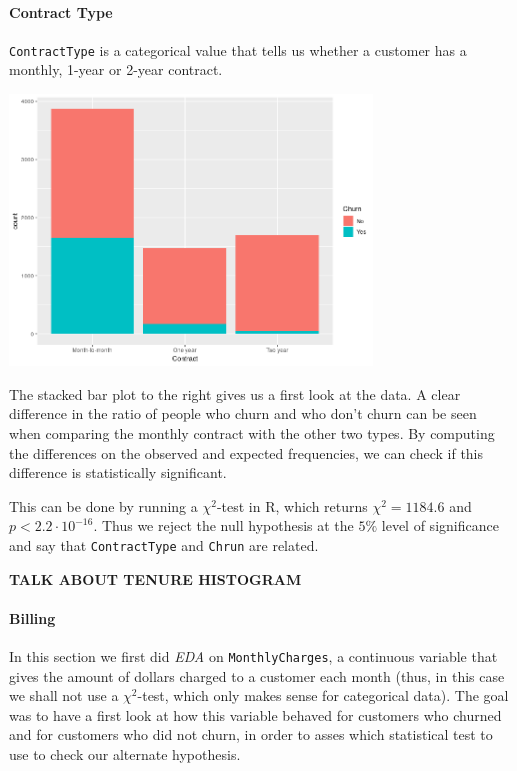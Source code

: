 \documentclass[man, floatsintext]{apa6}
\begin{document}
\paragraph{Contract Type}
\texttt{ContractType} is a categorical value that tells us whether a customer has a monthly, 1-year or 2-year contract. 

\hspace{0.5mm}

\noindent\begin{minipage}{0.54\textwidth}
\includegraphics[width = \linewidth, height = 72mm]{CountvsContractTypebyChurn}
\end{minipage}
\hfill
\begin{minipage}{0.42\textwidth} The stacked bar plot to the right gives us a first look at the data. A clear difference in the ratio of people who churn and who don't churn can be seen when comparing the monthly contract with the other two types. By computing the differences on the observed and expected frequencies, we can check if this difference is statistically significant. 
\end{minipage}  

\hspace{0.5mm}

This can be done by running a $\chi^2$-test in R, which returns $\chi^2 = 1184.6$ and $p < 2.2 \cdot 10^{-16}$. Thus we reject the null hypothesis at the $5 \%$ level of significance and say that \texttt{ContractType} and \texttt{Chrun} are related.  

\textbf{TALK ABOUT TENURE HISTOGRAM}

\paragraph{Billing}

In this section we first did \textit{EDA} on \texttt{MonthlyCharges}, a continuous variable that gives the amount of dollars charged to a customer each month (thus, in this case we shall not use a $\chi^2$-test, which only makes sense for categorical data). The goal was to have a first look at how this variable behaved for customers who churned and for customers who did not churn, in order to asses which statistical test to use to check our alternate hypothesis. 
\end{document}
